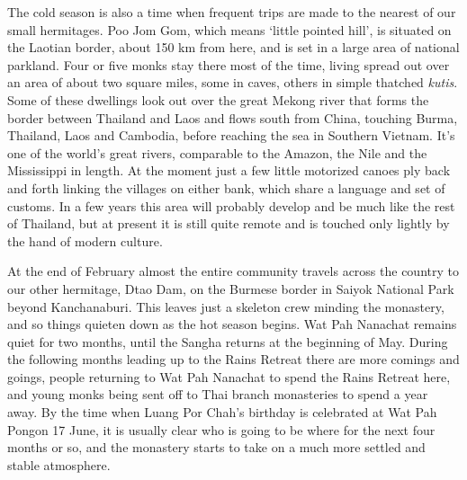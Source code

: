 The cold season is also a time when frequent trips are made to the
nearest of our small hermitages. Poo Jom Gom, which means `little
pointed hill', is situated on the Laotian border, about 150 km from
here, and is set in a large area of national parkland. Four or five
monks stay there most of the time, living spread out over an area of
about two square miles, some in caves, others in simple thatched
\emph{kutis}. Some of these dwellings look out over the great Mekong
river that forms the border between Thailand and Laos and flows south
from China, touching Burma, Thailand, Laos and Cambodia, before reaching
the sea in Southern Vietnam. It's one of the world's great rivers,
comparable to the Amazon, the Nile and the Mississippi in length. At the
moment just a few little motorized canoes ply back and forth linking the
villages on either bank, which share a language and set of customs. In a
few years this area will probably develop and be much like the rest of
Thailand, but at present it is still quite remote and is touched only
lightly by the hand of modern culture.

At the end of February almost the entire community travels across the
country to our other hermitage, Dtao Dam, on the Burmese border in
Saiyok National Park beyond Kanchanaburi. This leaves just a skeleton
crew minding the monastery, and so things quieten down as the hot season
begins. Wat Pah Nanachat remains quiet for two months, until the Sangha
returns at the beginning of May. During the following months leading up
to the Rains Retreat there are more comings and goings, people returning
to Wat Pah Nanachat to spend the Rains Retreat here, and young monks
being sent off to Thai branch monasteries to spend a year away. By the
time when Luang Por Chah's birthday is celebrated at Wat Pah Pongon 17
June, it is usually clear who is going to be where for the next four
months or so, and the monastery starts to take on a much more settled
and stable atmosphere.

